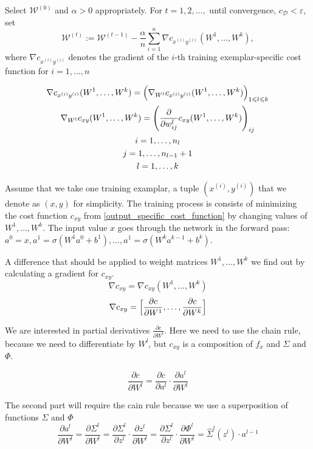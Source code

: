 \documentclass[draft]{article}
\begin{document}
Select $\mathcal{W}^{(0)}$ and $\alpha > 0$ appropriately. For $t = 1,2,\dots,$ until convergence, $c_{\mathcal{D}} < \varepsilon$, set
\[
\mathcal{W}^{(t)} := \mathcal{W}^{(t-1)} - \frac{\alpha}{n} \sum_{i=1}^n \nabla c_{x^{(i)}y^{(i)}}(W^1,\dots,W^k),
\]
where $\nabla c_{x^{(i)}y^{(i)}}$ denotes the gradient of the $i$-th training exemplar-specific cost function for $i = 1,\dots,n$

\begin{gather}
\nabla c_{x^{(i)}y^{(i)}}(W^1,\dots,W^k) = \Bigl(\nabla_{W^l} c_{x^{(i)}y^{(i)}}(W^1,\dots,W^k) \Bigr)_{1\leqslant l \leqslant k} \\
\nabla_{W^l} c_{xy}(W^1,\dots,W^k) = \Biggl( \frac{\partial}{\partial w_{ij}^l} c_{xy}(W^1,\dots,W^k) \Biggr)_{ij} \\
i = 1,\dots,n_l \\
j = 1,\dots,n_{l-1} + 1 \\
l = 1,\dots,k
\end{gather}

Assume that we take one training examplar, a tuple $(x^{(i)}, y^{(i)})$ that we denote as $(x,y)$ for simplicity. The training process is consists of minimizing the cost function $c_{xy}$  from \eqref{output_specific_cost_function} by changing values of $W^1,\dots,W^k$. The input value $x$ goes through the network in the forward pass: $a^0 = x, a^1 = \sigma(W^1 a^0 + b^1), \dots, a^1 = \sigma(W^k a^{k-1} + b^k)$.

A difference that should be applied to weight matrices $W^1, \dots, W^k$ we find out by calculating a gradient for $c_{xy}$.
\[
\nabla c_{xy} = \nabla c_{xy}(W^1,\dots,W^k)
\]
\[
\nabla c_{xy} = \Bigl[\frac{\partial c}{\partial W^1}, \dots, \frac{\partial c}{\partial W^k}\Bigr]
\]

We are interested in partial derivatives $\frac{\partial c}{\partial W^l}$. Here we need to use the chain rule, because we need to differentiate by $W^l$, but $c_{xy}$ is a composition of $f_x$ and $\Sigma$ and $\Phi$.

\[
\frac{\partial c}{\partial W^l} = \frac{\partial c}{\partial a^l} \cdot \frac{\partial a^l}{\partial W^l}
\]

The second part will require the cain rule because we use a superposition of functions $\Sigma$ and $\Phi$
\[
\frac{\partial a^l}{\partial W^l} = \frac{\partial \Sigma^l}{\partial W^l} = \frac{\partial \Sigma^l}{\partial z^l} \cdot \frac{\partial z^l}{\partial W^l} = \frac{\partial \Sigma^l}{\partial z^l} \cdot \frac{\partial \Phi^l}{\partial W^l} = \hat\Sigma^l(z^l) \cdot a^{l-1}
\]
\end{document}
